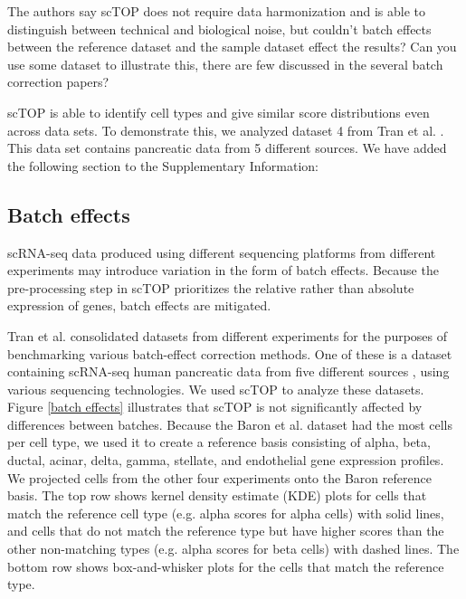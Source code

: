 \documentclass[12pt,american]{scrartcl}
\begin{document}
\begin{revcomment}
    The authors say scTOP does not require data harmonization and 
is able to distinguish between technical and biological noise, but 
couldn’t batch effects between the reference dataset and the sample 
dataset effect the results? Can you use some dataset to illustrate this,
 there are few discussed in the several batch correction papers?
\end{revcomment}
\begin{revresponse}
    scTOP is able to identify cell types and give similar score distributions even across data sets. To demonstrate this, we analyzed dataset 4 from Tran et al. \cite{tran2020benchmark}. This data set contains pancreatic data from 5 different sources. We have added the following section to the Supplementary Information:

    \begin{changes}      
        \subsection*{Batch effects}
        scRNA-seq data produced using different sequencing platforms from different experiments may introduce variation in the form of batch effects. Because the pre-processing step in scTOP prioritizes the relative rather than absolute expression of genes, batch effects are mitigated.
        
        Tran et al. \cite{tran2020benchmark} consolidated datasets from different experiments for the purposes of benchmarking various batch-effect correction methods. One of these is a dataset containing scRNA-seq human pancreatic data from five different sources \cite{baron2016single} \cite{muraro2016single} \cite{segerstolpe2016single} \cite{wang2016single} \cite{xin2016rna}, using various sequencing technologies. We used scTOP to analyze these datasets. Figure \ref{batch effects} illustrates that scTOP is not significantly affected by differences between batches. Because the Baron et al. dataset had the most cells per cell type, we used it to create a reference basis consisting of alpha, beta, ductal, acinar, delta, gamma, stellate, and endothelial gene expression profiles. We projected cells from the other four experiments onto the Baron reference basis. The top row shows kernel density estimate (KDE) plots for cells that match the reference cell type (e.g. alpha scores for alpha cells) with solid lines, and cells that do not match the reference type but have higher scores than the other non-matching types (e.g. alpha scores for beta cells) with dashed lines. The bottom row shows box-and-whisker plots for the cells that match the reference type.


\end{changes}
\end{revresponse}
\end{document}
